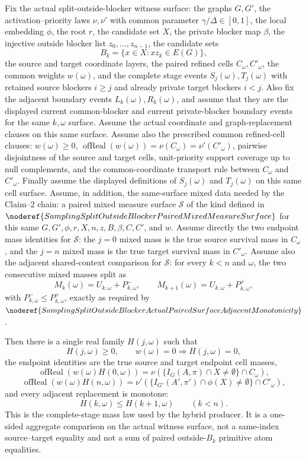 \begin{helper}
Fix the actual split-outside-blocker witness surface: the graphs \(G,G'\), the
activation--priority laws \(\nu,\nu'\) with common parameter
\(\gamma/\Delta\in[0,1]\), the local embedding \(\phi\), the root \(r\), the
candidate set \(X\), the private blocker map \(\beta\), the injective outside
blocker list \(z_0,\ldots,z_{n-1}\), the candidate sets
\[
  B_k=\{x\in X:xz_k\in E(G)\},
\]
the source and target coordinate layers, the paired refined cells
\(C_\omega,C'_\omega\), the common weights \(w(\omega)\), and the complete
stage events \(S_j(\omega),T_j(\omega)\) with retained source blockers
\(i\ge j\) and already private target blockers \(i<j\).  Also fix the
adjacent boundary events \(L_k(\omega),R_k(\omega)\), and assume that they
are the displayed current common-blocker and current private-blocker boundary
events for the same \(k,\omega\) surface.  Assume the actual coordinate and
graph-replacement clauses on this same surface.  Assume also the prescribed
common refined-cell clauses: \(w(\omega)\ge0\),
\(\operatorname{ofReal}(w(\omega))=\nu(C_\omega)=\nu'(C'_\omega)\), pairwise
disjointness of the source and target cells, unit-priority support coverage
up to null complements, and the common-coordinate transport rule between
\(C_\omega\) and \(C'_\omega\).  Finally assume the displayed definitions of
\(S_j(\omega)\) and \(T_j(\omega)\) on this same cell surface.
Assume, in addition, the same-surface mixed data needed by the Claim--2
chain: a paired mixed measure surface \(\mathcal S\) of the kind defined in
\(\noderef{SamplingSplitOutsideBlockerPairedMixedMeasureSurface}\) for this
same \(G,G',\phi,r,X,n,z,B,\beta,C,C'\), and \(w\).  Assume directly the two
endpoint mass identities for \(\mathcal S\): the \(j=0\) mixed mass is the
true source survival mass in \(C_\omega\), and the \(j=n\) mixed mass is the
true target survival mass in \(C'_\omega\).  Assume also the adjacent
shared-context comparison for \(\mathcal S\): for every
\(k<n\) and \(\omega\), the two consecutive mixed masses split as
\[
M_k(\omega)=U_{k,\omega}+P^-_{k,\omega},\qquad
M_{k+1}(\omega)=U_{k,\omega}+P^+_{k,\omega},
\]
with \(P^-_{k,\omega}\le P^+_{k,\omega}\), exactly as required by
\(\noderef{SamplingSplitOutsideBlockerActualPairedSurfaceAdjacentMonotonicity}\).

Then there is a single real family \(H(j,\omega)\) such that
\[
H(j,\omega)\ge0,\qquad w(\omega)=0\Rightarrow H(j,\omega)=0,
\]
the endpoint identities are the true source and target endpoint cell masses,
\[
\operatorname{ofReal}(w(\omega)H(0,\omega))
=\nu(\{I_G(A,\pi)\cap X\ne\emptyset\}\cap C_\omega),
\]
\[
\operatorname{ofReal}(w(\omega)H(n,\omega))
=\nu'(\{I_{G'}(A',\pi')\cap \phi(X)\ne\emptyset\}\cap C'_\omega),
\]
and every adjacent replacement is monotone:
\[
  H(k,\omega)\le H(k+1,\omega)\qquad(k<n).
\]
This is the complete-stage mass law used by the hybrid producer.  It is a
one-sided aggregate comparison on the actual witness surface, not a
same-index source--target equality and not a sum of paired outside-\(B_k\)
primitive atom equalities.
\end{helper}
